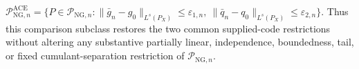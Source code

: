 \(\mathcal P_{\mathrm{NG},n}^{\mathrm{ACE}}=\{P\in\mathcal P_{\mathrm{NG},n}:\|\bar g_n-g_0\|_{L^s(P_X)}\le\varepsilon_{1,n},\ \|\bar q_n-q_0\|_{L^s(P_X)}\le\varepsilon_{2,n}\}\).  Thus this comparison subclass restores the two common supplied-code restrictions without altering any substantive partially linear, independence, boundedness, tail, or fixed cumulant-separation restriction of \(\mathcal P_{\mathrm{NG},n}\).